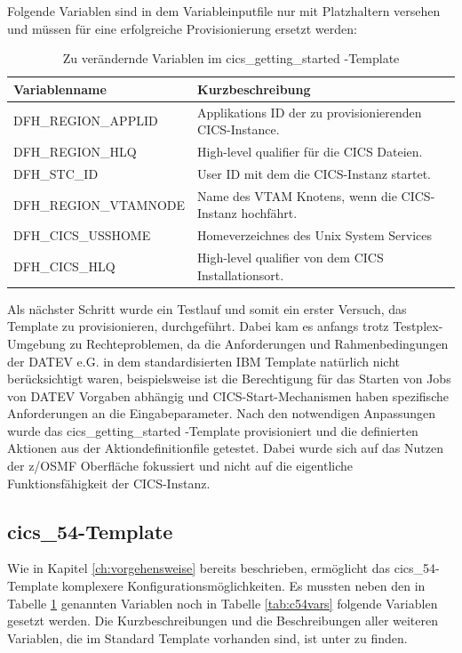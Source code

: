 Folgende Variablen sind in dem Variableinputfile nur mit Platzhaltern versehen und müssen für eine erfolgreiche Provisionierung ersetzt werden:
\begin{table}[h]
\centering
\begin{tabularx}{\textwidth}{X|X}
Variablenname & Kurzbeschreibung \\
\hline
DFH\_REGION\_APPLID & Applikations ID der zu provisionierenden CICS-Instance. \\
\hline
DFH\_REGION\_HLQ & High-level qualifier für die CICS Dateien.\\
\hline
DFH\_STC\_ID & User ID mit dem die CICS-Instanz startet. \\
\hline
DFH\_REGION\_VTAMNODE & Name des VTAM Knotens, wenn die CICS-Instanz hochfährt. \\
\hline
DFH\_CICS\_USSHOME & Homeverzeichnes des Unix System Services \\
\hline
DFH\_CICS\_HLQ & High-level qualifier von dem CICS Installationsort. \\
\end{tabularx}
\caption{Zu verändernde Variablen im \glqq cics\_getting\_started \grqq-Template}
\label{tab:cgsvars}
\end{table}

Als nächster Schritt wurde ein Testlauf und somit ein erster Versuch, das Template zu provisionieren, durchgeführt.
Dabei kam es anfangs trotz Testplex-Umgebung zu Rechteproblemen, da die Anforderungen und Rahmenbedingungen der DATEV e.G. in dem standardisierten IBM Template natürlich nicht berücksichtigt waren, beispielsweise ist die Berechtigung für das Starten von Jobs von DATEV Vorgaben abhängig und CICS-Start-Mechanismen haben spezifische Anforderungen an die Eingabeparameter.
Nach den notwendigen Anpassungen wurde das \glqq cics\_getting\_started \grqq-Template provisioniert und die definierten Aktionen aus der Aktiondefinitionfile getestet.
Dabei wurde sich auf das Nutzen der z/OSMF Oberfläche fokussiert und nicht auf die eigentliche Funktionsfähigkeit der CICS-Instanz. 

\subsection{\glqq cics\_54\grqq-Template}
Wie in Kapitel \ref{ch:vorgehensweise} bereits beschrieben, ermöglicht das \glqq cics\_54\grqq-Template komplexere Konfigurationsmöglichkeiten.
Es mussten neben den in Tabelle \ref{tab:cgsvars} genannten Variablen noch in Tabelle \ref{tab:c54vars} folgende Variablen gesetzt werden.
Die Kurzbeschreibungen und die Beschreibungen aller weiteren Variablen, die im Standard Template vorhanden sind, ist unter \cite{.26.2.2020b} zu finden.

